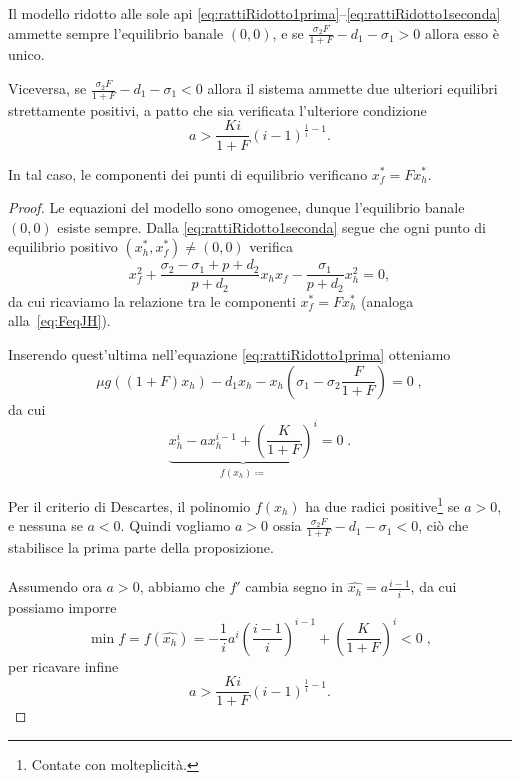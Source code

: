 \begin{proposizione}
    Il modello ridotto alle sole api \eqref{eq:rattiRidotto1prima}--\eqref{eq:rattiRidotto1seconda} ammette sempre l'equilibrio banale $(0,0)$, e se $\frac{\sigma_2 F}{1+F} - d_1 - \sigma_1 >0$ allora esso è unico.

    Viceversa, se $\frac{\sigma_2 F}{1+F} - d_1 - \sigma_1 <0$ allora il sistema ammette due ulteriori equilibri strettamente positivi, a patto che sia verificata l'ulteriore condizione
    $$a > \frac{Ki}{1+F} (i-1)^{\frac{1}{i} -1}.$$

    In tal caso, le componenti dei punti di equilibrio verificano $x_f^* = F x_h^*$.
    \label{prop:rExist}
\end{proposizione}

\begin{proof}
    Le equazioni del modello sono omogenee, dunque l'equilibrio banale $(0,0)$ esiste sempre.
    Dalla \eqref{eq:rattiRidotto1seconda} segue che ogni punto di equilibrio positivo
    $(x_h^*, x_f^*) \neq (0,0)$ verifica
    $$x_f^2 + \frac{\sigma_2 - \sigma_1 + p + d_2}{p +d_2} x_h x_f - \frac{\sigma_1}{p+d_2} x_h^2 = 0,$$
    da cui ricaviamo la relazione tra le componenti $x_f^* = F x_h^*$ (analoga alla~\eqref{eq:FeqJH}).

    Inserendo quest'ultima nell'equazione \eqref{eq:rattiRidotto1prima} otteniamo
    $$ \mu g \left( (1+F) x_h \right) -d_1 x_h -x_h \left( \sigma_1 - \sigma_2 \frac{F}{1+F} \right) = 0 \; ,$$
    da cui
    $$ \underbrace{ x_h^i -a x_h^{i-1} + \left( { \frac{K}{1+F} } \right)^i }_{ f(x_h) \coloneq } = 0 \; .$$

    Per il criterio di Descartes, il polinomio $f(x_h)$ ha due radici positive\footnote{Contate con molteplicità.}
    se $a>0$, e nessuna se $a<0$. Quindi vogliamo $a>0$ ossia $\frac{\sigma_2 F}{1+F} -d_1 - \sigma_1 < 0$, ciò che
    stabilisce la prima parte della proposizione.

    \paragraph{}
    Assumendo ora $a>0$, abbiamo che $f'$ cambia segno in $\hat{ x_h } = a \frac{i-1}{i}$, da cui
    possiamo imporre
    $$\min f = f( \hat{ x_h } ) =
    - \frac{1}{i} a^i { \left( \frac{i-1}{i} \right) }^{i-1} + {\left( \frac{K}{1+F} \right) }^i < 0
    \; ,$$
    per ricavare infine
    $$a > \frac{Ki}{1+F} {(i-1)}^{ \frac{1}{i} - 1 }.$$
\end{proof}

